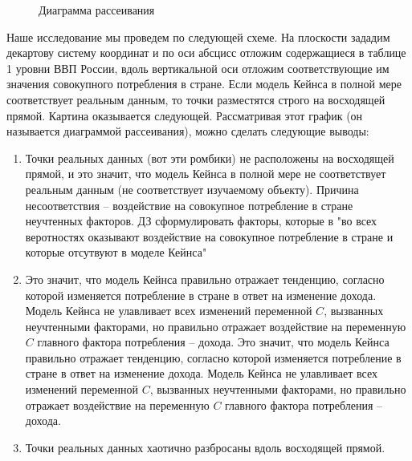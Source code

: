 \documentclass[12pt,a4paper]{article}
\begin{document}
\begin{figure}[H]
\begin{center}
\end{center}
\caption{Диаграмма рассеивания}
\end{figure}

Наше исследование мы проведем по следующей схеме. На плоскости зададим декартову систему координат и по оси абсцисс отложим содержащиеся в таблице 1 уровни ВВП России, вдоль вертикальной оси отложим соответствующие им значения совокупного потребления в стране. Если модель Кейнса в полной мере соответствует реальным данным, то точки разместятся строго на восходящей прямой. Картина оказывается следующей. Рассматривая этот график (он называется диаграммой рассеивания), можно сделать следующие выводы:
\begin{enumerate}
\item Точки реальных данных (вот эти ромбики) не расположены на восходящей прямой, и это значит, что модель Кейнса в полной мере не соответствует реальным данным (не соответствует изучаемому объекту). Причина несоответствия -- воздействие на совокупное потребление в стране неучтенных факторов.
ДЗ сформулировать факторы, которые в "во всех веротностях оказывают воздействие на совокупное потребление в стране и которые отсутвуют в моделе Кейнса"
\item Это значит, что модель Кейнса правильно отражает тенденцию, согласно которой изменяется потребление в стране в ответ на изменение дохода.
Модель Кейнса не улавливает всех изменений переменной $C$, вызванных неучтенными факторами, но правильно отражает воздействие на переменную $C$ главного фактора потребления -- дохода.
Это значит, что модель Кейнса правильно отражает тенденцию, согласно которой изменяется потребление в стране в ответ на изменение дохода.
Модель Кейнса не улавливает всех изменений переменной $C$, вызванных неучтенными факторами, но правильно отражает воздействие на переменную $C$ главного фактора потребления -- дохода.
\item Точки реальных данных хаотично разбросаны вдоль восходящей прямой.
\end{enumerate}
\end{document}
